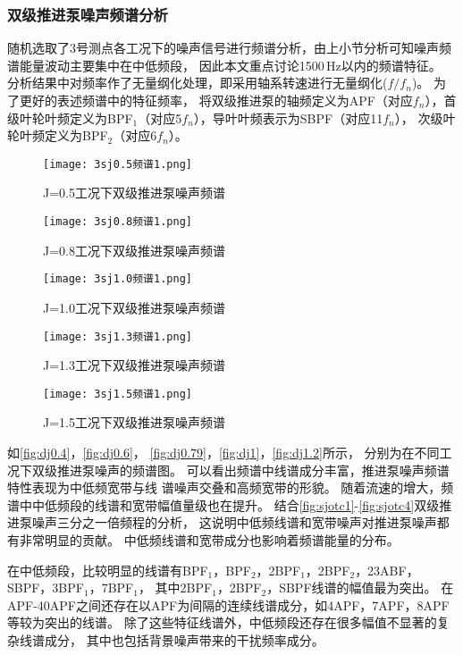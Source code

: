 \subsubsection{双级推进泵噪声频谱分析}
随机选取了3号测点各工况下的噪声信号进行频谱分析，由上小节分析可知噪声频谱能量波动主要集中在中低频段，
因此本文重点讨论1500\,Hz以内的频谱特征。
分析结果中对频率作了无量纲化处理，即采用轴系转速进行无量纲化($f/f_n$)。
为了更好的表述频谱中的特征频率，
将双级推进泵的轴频定义为APF（对应$f_n$），首级叶轮叶频定义为BPF$_1$（对应5$f_n$），导叶叶频表示为SBPF（对应11$f_n$），
次级叶轮叶频定义为BPF$_2$（对应6$f_n$）。
\begin{figure}[htbp]
    \centering
    \texttt{[image: 3sj0.5频谱1.png]}
    \caption{\label{fig:sj0.5}J=0.5工况下双级推进泵噪声频谱}
\end{figure}
\begin{figure}[htbp]
    \centering
    \texttt{[image: 3sj0.8频谱1.png]}
    \caption{\label{fig:sj0.8}J=0.8工况下双级推进泵噪声频谱}
\end{figure}
\begin{figure}[htbp]
    \centering
    \texttt{[image: 3sj1.0频谱1.png]}
    \caption{\label{fig:sj1.0}J=1.0工况下双级推进泵噪声频谱}
\end{figure}
\begin{figure}[htbp]
    \centering
    \texttt{[image: 3sj1.3频谱1.png]}
    \caption{\label{fig:sj1.3}J=1.3工况下双级推进泵噪声频谱}
\end{figure}
\begin{figure}[htbp]
    \centering
    \texttt{[image: 3sj1.5频谱1.png]}
    \caption{\label{fig:sj1.5}J=1.5工况下双级推进泵噪声频谱}
\end{figure}

如\autoref{fig:dj0.4}，\autoref{fig:dj0.6}，
\autoref{fig:dj0.79}，\autoref{fig:dj1}，\autoref{fig:dj1.2}所示，
分别为在不同工况下双级推进泵噪声的频谱图。
可以看出频谱中线谱成分丰富，推进泵噪声频谱特性表现为中低频宽带与线
谱噪声交叠和高频宽带的形貌。
随着流速的增大，频谱中中低频段的线谱和宽带幅值量级也在提升。
结合\autoref{fig:sjotc1}-\autoref{fig:sjotc4}双级推进泵噪声三分之一倍频程的分析，
这说明中低频线谱和宽带噪声对推进泵噪声都有非常明显的贡献。
中低频线谱和宽带成分也影响着频谱能量的分布。

在中低频段，比较明显的线谱有BPF$_1$，BPF$_2$，2BPF$_1$，2BPF$_2$，23ABF，SBPF，3BPF$_1$，7BPF$_1$，
其中2BPF$_1$，2BPF$_2$，SBPF线谱的幅值最为突出。
在APF-40APF之间还存在以APF为间隔的连续线谱成分，如4APF，7APF，8APF等较为突出的线谱。
除了这些特征线谱外，中低频段还存在很多幅值不显著的复杂线谱成分，
其中也包括背景噪声带来的干扰频率成分。

